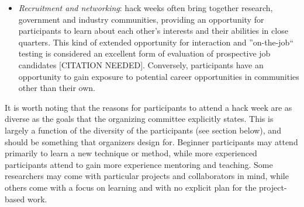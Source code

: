\begin{itemize}
{Despite the impact of interdisciplinary research \cite{Hall2012-hi}, these experiments are often discouraged in traditional disciplinary research, because of the difficulty to achieve results in both disciplines, and because of the risks inherent in taking a less trodden path\footnote{\url{https://www.ncbi.nlm.nih.gov/labs/articles/12970550} and \url{https://www.researchgate.net/publication/8126355_EDUCATION_Risks_and_Rewards_of_an_Interdisciplinary_Research_Path}}.}

\item{\textit{Recruitment and networking}: hack weeks often bring together research, government and industry communities, providing an opportunity for participants to learn about each other's interests and their abilities in close quarters.
This kind of extended opportunity for interaction and ''on-the-job`` testing is considered an excellent form of evaluation of prospective job candidates [CITATION NEEDED].
Conversely, participants have an opportunity to gain exposure to potential career opportunities in communities other than their own.}
\end{itemize}

It is worth noting that the reasons for participants to attend a hack week are as diverse as the goals that the organizing committee explicitly states.
This is largely a function of the diversity of the participants (see section below), and should be something that organizers design for.
Beginner participants may attend primarily to learn a new technique or method, while more experienced participants attend to gain more experience mentoring and teaching.
Some researchers may come with particular projects and collaborators in mind, while others come with a focus on learning and with no explicit plan for the project-based work.
